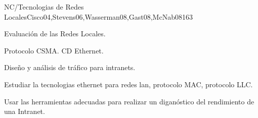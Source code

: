 \begin{syllabus}
   \begin{unit}{NC/Tecnologias de Redes Locales}{}{Cisco04,Stevens06,Wasserman08,Gast08,McNab08}{16}{3}
      \begin{topics}
         \item Evaluación de las  Redes  Locales.
         \item Protocolo CSMA. CD Ethernet.
         \item Diseño y  análisis de  tráfico para intranets.
      \end{topics}
   
      \begin{learningoutcomes}
         \item Estudiar la tecnologias  ethernet  para redes lan, protocolo MAC, protocolo LLC.
         \item Usar las  herramientas  adecuadas para realizar un diganóstico del rendimiento de una Intranet.
      \end{learningoutcomes}
   \end{unit}
   
   \begin{coursebibliography}
   \end{coursebibliography}
   
   \end{syllabus}
   